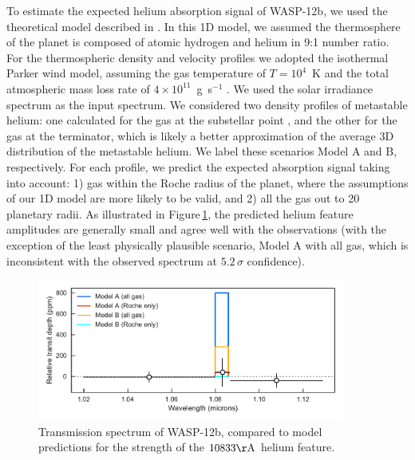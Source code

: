\documentclass[RNAAS]{aastex62}
\begin{document}
To estimate the expected helium absorption signal of WASP-12b,
we used the theoretical model described in \cite{oklopcic18}.
In this 1D model, we assumed the thermosphere of the planet is composed of atomic hydrogen and helium in 9:1 number
ratio. For the thermospheric density and velocity profiles we adopted the
isothermal Parker wind model, assuming the gas temperature of $T=10^4$~K and the
total atmospheric mass loss rate of $4\times 10^{11}$~g~s$^{-1}$ \citep[based on
the results of hydrodynamic simulations of atmospheric escape in WASP-12b
by][]{salz16}. We used the solar irradiance spectrum as the input spectrum. 
We considered two density profiles of metastable helium: one calculated for the
gas at the substellar point \citep[as in][]{oklopcic18}, and the other for the
gas at the terminator, which is likely a better approximation of the average 3D
distribution of the metastable helium. We label these scenarios Model A and B,
respectively. For each profile, we predict the expected absorption signal taking into account: 1) gas within the Roche radius of the planet, where the assumptions of our 1D model are more likely to be valid, and 2) all the gas out to 20 planetary radii. 
As illustrated in Figure\,\ref{fig:spectrum}, the predicted helium feature
amplitudes are generally small and agree well with the observations (with the
exception of the least physically plausible scenario, Model A with all gas,
which is inconsistent with the observed spectrum at $5.2\,\sigma$ confidence). 

\begin{figure}[b!]
\begin{centering}
\includegraphics[width = 0.9\textwidth]{Figures/fig1.pdf}
\caption{Transmission spectrum of WASP-12b, compared to model predictions for
the strength of the $10833\mathrm{\AA}$ helium feature.}
\end{centering}
\label{fig:spectrum}
\end{figure}

\end{document}

